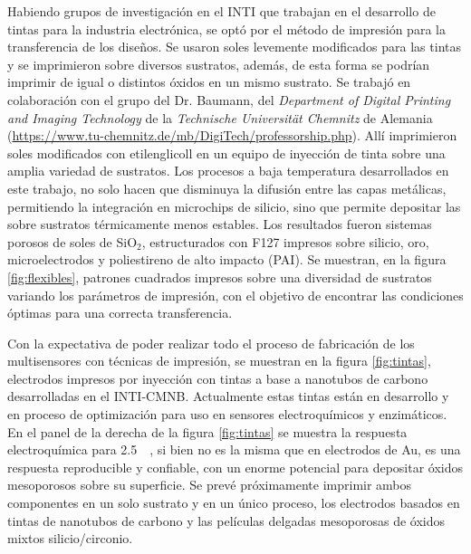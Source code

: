  	  Habiendo grupos de investigación en el INTI que trabajan en el desarrollo de tintas para la industria electrónica, se optó por el método de impresión para la transferencia de los diseños. Se usaron soles levemente modificados para las tintas y se imprimieron sobre diversos sustratos, además, de esta forma se podrían imprimir \pdm\space de igual o distintos óxidos en un mismo sustrato. Se trabajó en colaboración con el grupo del Dr. Baumann, del \textit{Department of Digital Printing and Imaging Technology} de la \textit{Technische Universität Chemnitz} de Alemania (\url{https://www.tu-chemnitz.de/mb/DigiTech/professorship.php}). Allí imprimieron soles modificados con etilenglicoll en un equipo de inyección de tinta sobre una amplia variedad de sustratos. Los procesos a baja temperatura desarrollados en este trabajo, no solo hacen que disminuya la difusión entre las capas metálicas, permitiendo la integración en microchips de silicio, sino que permite depositar las \pdm\space sobre sustratos térmicamente menos estables. Los resultados fueron sistemas porosos de soles de SiO$_2$, estructurados con F127 impresos sobre silicio, oro, microelectrodos y poliestireno de alto impacto (PAI). Se muestran, en la figura \ref{fig:flexibles}, patrones cuadrados impresos sobre una diversidad de sustratos variando los parámetros de impresión, con el objetivo de encontrar las condiciones óptimas para una correcta transferencia.

 	  Con la expectativa de poder realizar todo el proceso de fabricación de los multisensores con técnicas de impresión, se muestran en la figura \ref{fig:tintas}, electrodos impresos por inyección con tintas a base a nanotubos de carbono desarrolladas en el INTI-CMNB. Actualmente estas tintas están en desarrollo y en proceso de optimización para uso en sensores electroquímicos y enzimáticos\cite{longinotti2010,Mass2016}. En el panel de la derecha de la figura \ref{fig:tintas} se muestra la respuesta electroquímica para \fe\space \SI{2.5}{\milli\Molar}, si bien no es la misma que en electrodos de Au, es una respuesta reproducible y confiable, con un enorme potencial para depositar óxidos mesoporosos sobre su superficie. Se prevé próximamente imprimir ambos componentes en un solo sustrato y en un único proceso, los electrodos basados en tintas de nanotubos de carbono y las películas delgadas mesoporosas de óxidos mixtos silicio/circonio.

